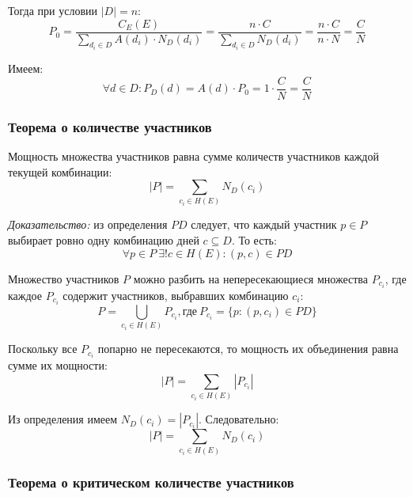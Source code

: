 Тогда при условии $|D| = n$:
\begin{equation}
	P_0 = \frac{C_E(E)}{\sum_{d_i \in D}{A(d_i) \cdot N_D(d_i)}} = \frac{n \cdot C}{\sum_{d_i \in D}{N_D(d_i)}} = \frac{n \cdot C}{n \cdot N} = \frac{C}{N}
\end{equation}

Имеем:
\begin{equation}
	\forall d \in D: P_D(d) = A(d) \cdot P_0 = 1 \cdot \frac{C}{N} = \frac{C}{N}
\end{equation}

\subsubsection{Теорема о количестве участников}

Мощность множества участников равна сумме количеств участников каждой текущей комбинации:
\begin{equation}
	|P| = \sum_{c_i \in H(E)}{N_D(c_i)}
\end{equation}

\textit{Доказательство:} из определения $PD$ следует, что каждый участник $p \in P$ выбирает ровно одну комбинацию дней $c \subseteq D$. То есть:
\begin{equation}
	\forall p \in P \ \exists! c \in H(E): (p, c) \in PD
\end{equation}

Множество участников $P$ можно разбить на непересекающиеся множества $P_{c_i}$, где каждое $P_{c_i}$ содержит участников, выбравших комбинацию $c_i$:
\begin{equation}
	P = \bigcup_{c_i \in H(E)}{P_{c_i}}, \text{где} \ P_{c_i} = \{p: (p, c_i) \in PD\}
\end{equation}

Поскольку все $P_{c_i}$ попарно не пересекаются, то мощность их объединения равна сумме их мощности:
\begin{equation}
	|P| = \sum_{c_i \in H(E)}{|P_{c_i}|}
\end{equation}

Из определения имеем $N_D(c_i) = |P_{c_i}|$. Следовательно:
\begin{equation}
	|P| = \sum_{c_i \in H(E)}{N_D(c_i)}
\end{equation}

\subsubsection{Теорема о критическом количестве участников}

